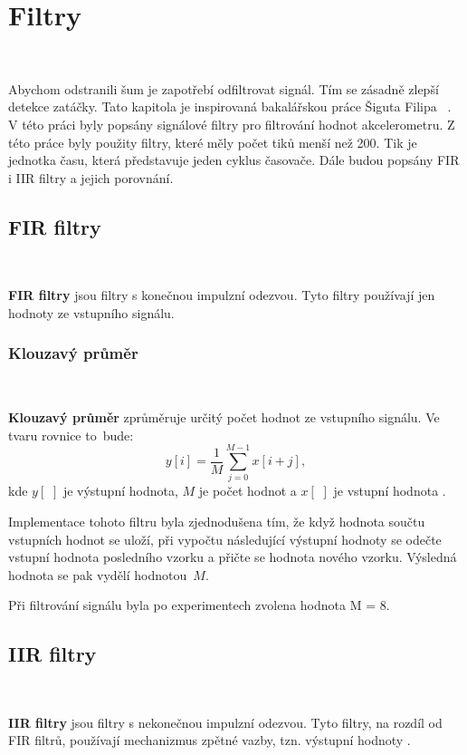 \chapter{Filtry}
\label{sec:Filters}
\

Abychom odstranili šum je zapotřebí odfiltrovat signál. Tím se zásadně zlepší
detekce zatáčky. Tato kapitola je inspirovaná bakalářskou práce Šiguta Filipa
~\cite{krokomer}.
V této práci byly popsány signálové filtry pro filtrování hodnot akcelerometru. Z této práce byly použity filtry, které měly počet tiků menší než 200. Tik je jednotka času, která představuje jeden cyklus časovače. Dále budou popsány FIR i IIR filtry a jejich porovnání.

\section{FIR filtry}\

\textbf{FIR filtry} jsou filtry s konečnou impulzní odezvou. Tyto filtry používají
jen hodnoty ze vstupního signálu\cite{FIR}.

\subsection{Klouzavý průměr}\

\textbf{Klouzavý průměr} zprůměruje určitý počet hodnot ze vstupního signálu. Ve
tvaru rovnice to~bude:
\begin{equation}
y[i] = \frac{1}{M}\sum_{j = 0}^{M - 1}x[i+j],
\end{equation}
kde $y[\,\,]$ je výstupní hodnota, $M$ je počet hodnot a $x[\,\,]$ je vstupní
hodnota \cite{Filters}.

Implementace tohoto filtru byla zjednodušena tím, že když hodnota součtu vstupních
hodnot se uloží, při vypočtu následující výstupní hodnoty se odečte vstupní hodnota
posledního vzorku a přičte se hodnota nového vzorku. Výsledná hodnota se pak vydělí
hodnotou~$M$\cite{krokomer}.

Při filtrování signálu byla po experimentech zvolena hodnota M = 8.

\section{IIR filtry}\

\textbf{IIR filtry} jsou filtry s nekonečnou impulzní odezvou. Tyto filtry, na
rozdíl od FIR filtrů, používají mechanizmus zpětné vazby, tzn. výstupní
hodnoty \cite{IIR}.

